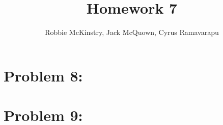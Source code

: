 \documentclass[12pt]{article}
\begin{document}
\title{Homework 7}
\author{Robbie McKinstry, Jack McQuown, Cyrus Ramavarapu}
\renewcommand{\today}{19 September 2016}
\renewcommand{\baselinestretch}{1.5}
\maketitle

\section*{Problem 8: }
\section*{Problem 9: }
\end{document}
